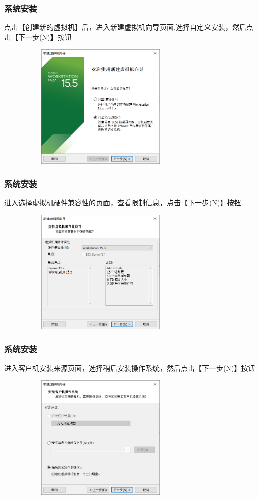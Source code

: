 \documentclass[notheorems,serif]{beamer}
\begin{document}
\begin{frame}
\frametitle{系统安装}
点击【创建新的虚拟机】后，进入新建虚拟机向导页面,选择自定义安装，然后点击【下一步(N)】按钮
\begin{figure}
\centering
\includegraphics[width=8cm,height=6cm]{./figures/图片9.png}
\end{figure}
\end{frame}

\begin{frame}
\frametitle{系统安装}
进入选择虚拟机硬件兼容性的页面，查看限制信息，点击【下一步(N)】按钮
\begin{figure}
\centering
\includegraphics[width=8cm,height=6cm]{./figures/图片10.png}
\end{figure}
\end{frame}

\begin{frame}
\frametitle{系统安装}
进入客户机安装来源页面，选择稍后安装操作系统，然后点击【下一步(N)】按钮
\begin{figure}
\centering
\includegraphics[width=8cm,height=6cm]{./figures/图片11.png}
\end{figure}
\end{frame}
\end{document}
